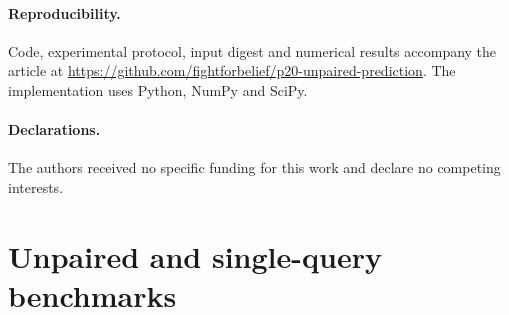 \documentclass[11pt]{article}
\begin{document}
\paragraph{Reproducibility.}
Code, experimental protocol, input digest and numerical results accompany the article at \url{https://github.com/fightforbelief/p20-unpaired-prediction}. The implementation uses Python, NumPy and SciPy.
\paragraph{Declarations.}
The authors received no specific funding for this work and declare no competing interests.

\appendix
\section{Unpaired and single-query benchmarks}\label{app:bench}

\end{document}
